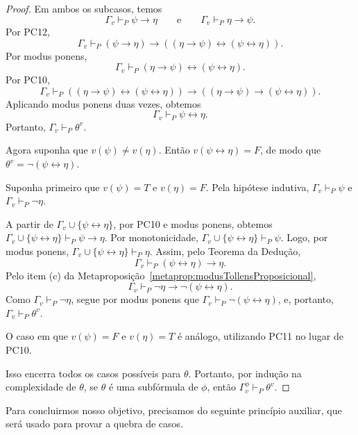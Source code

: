 \begin{proof}
        Em ambos os subcasos, temos
    \[
        \Gamma_v\vdash_P \psi\rightarrow\eta
        \qquad\text{e}\qquad
        \Gamma_v\vdash_P \eta\rightarrow\psi.
    \]
    Por PC12,
    \[
        \Gamma_v\vdash_P
        (\psi\rightarrow\eta)\rightarrow((\eta\rightarrow\psi)\leftrightarrow(\psi\leftrightarrow\eta)).
    \]
    Por modus ponens,
    \[
        \Gamma_v\vdash_P
        (\eta\rightarrow\psi)\leftrightarrow(\psi\leftrightarrow\eta).
    \]
    Por PC10,
    \[
        \Gamma_v\vdash_P
        ((\eta\rightarrow\psi)\leftrightarrow(\psi\leftrightarrow\eta))
        \rightarrow
        ((\eta\rightarrow\psi)\rightarrow(\psi\leftrightarrow\eta)).
    \]
    Aplicando modus ponens duas vezes, obtemos
    \[
        \Gamma_v\vdash_P \psi\leftrightarrow\eta.
    \]
    Portanto, $\Gamma_v\vdash_P \theta^v$.

    Agora suponha que $v(\psi)\neq v(\eta)$.
    Então $v(\psi\leftrightarrow\eta)=F$, de modo que $\theta^v=\neg(\psi\leftrightarrow\eta)$.

    Suponha primeiro que $v(\psi)=T$ e $v(\eta)=F$.
    Pela hipótese indutiva,
    $\Gamma_v\vdash_P \psi$
    e
    $\Gamma_v\vdash_P \neg\eta$.

    A partir de $\Gamma_v\cup\{\psi\leftrightarrow\eta\}$, por PC10 e modus ponens, obtemos $\Gamma_v\cup\{\psi\leftrightarrow\eta\}\vdash_P \psi\rightarrow\eta$.
    Por monotonicidade, $\Gamma_v\cup\{\psi\leftrightarrow\eta\}\vdash_P \psi$.
    Logo, por modus ponens, $\Gamma_v\cup\{\psi\leftrightarrow\eta\}\vdash_P \eta$.
    Assim, pelo Teorema da Dedução,
    \[
        \Gamma_v\vdash_P (\psi\leftrightarrow\eta)\rightarrow\eta.
    \]
    Pelo item (c) da Metaproposição~\ref{metaprop:modusTollensProposicional},
    \[
        \Gamma_v\vdash_P \neg\eta\rightarrow\neg(\psi\leftrightarrow\eta).
    \]
    Como $\Gamma_v\vdash_P \neg\eta$, segue por modus ponens que $\Gamma_v\vdash_P \neg(\psi\leftrightarrow\eta)$, e, portanto, $\Gamma_v\vdash_P \theta^v$.
    
    O caso em que $v(\psi)=F$ e $v(\eta)=T$ é análogo, utilizando PC11 no lugar de PC10.

    Isso encerra todos os casos possíveis para $\theta$.
    Portanto, por indução na complexidade de $\theta$, se $\theta$ é uma subfórmula de $\phi$, então $\Gamma_v^\phi\vdash_P \theta^v$.
\end{proof}

Para concluirmos nosso objetivo, precisamos do seguinte princípio auxiliar, que será usado para provar a quebra de casos.

